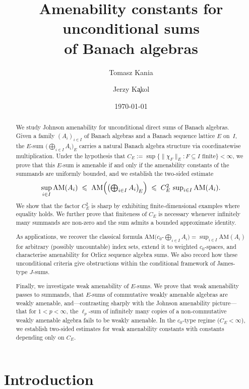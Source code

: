 \documentclass[reqno]{amsart}
\title[Amenability of unconditional sums]{Amenability constants for unconditional sums\\ of Banach algebras}
\author[T.~Kania]{Tomasz Kania}
\author{Jerzy K\c akol}
\date{\today}
\theoremstyle{plain}
\theoremstyle{definition}
\theoremstyle{remark}
\newcommand{\AM}{\mathrm{AM}}
\renewcommand{\le}{\leqslant}
\begin{document}
\begin{abstract}
We study Johnson amenability for unconditional direct sums of Banach algebras.
Given a family $(A_i)_{i\in I}$ of Banach algebras and a Banach sequence lattice $E$ on~$I$,
the $E$-sum $\bigl(\bigoplus_{i\in I} A_i\bigr)_{\!E}$ carries a natural Banach algebra structure
via coordinatewise multiplication.
Under the hypothesis that $C_E := \sup\{\|\chi_F\|_E: F\subseteq I\text{ finite}\}<\infty$,
we prove that this $E$-sum is amenable if and only if the amenability constants of the summands
are uniformly bounded, and we establish the two-sided estimate
\[
\sup_{i\in I}\AM(A_i) \;\le\; \AM\Bigl(\bigl(\textstyle\bigoplus_{i\in I} A_i\bigr)_{\!E}\Bigr)
\;\le\; C_E^2\,\sup_{i\in I}\AM(A_i).
\]
We show that the factor $C_E^2$ is sharp by exhibiting finite-dimensional examples where equality holds.
We further prove that finiteness of $C_E$ is necessary whenever infinitely many summands are non-zero
and the sum admits a bounded approximate identity.

As applications, we recover the classical formula
$\AM\bigl(c_0\text{-}\bigoplus_{i\in I} A_i\bigr) = \sup_{i\in I}\AM(A_i)$
for arbitrary (possibly uncountable) index sets, extend it to weighted $c_0$-spaces,
and characterise amenability for Orlicz sequence algebra sums.
We also record how these unconditional criteria give obstructions within the
conditional framework of James-type $J$-sums.

Finally, we investigate weak amenability of $E$-sums.
We prove that weak amenability passes to summands, that $E$-sums of commutative
weakly amenable algebras are weakly amenable, and---contrasting sharply with the
Johnson amenability picture---that for $1 < p < \infty$, the $\ell_p$-sum of
infinitely many copies of a non-commutative weakly amenable algebra fails to be
weakly amenable.
In the $c_0$-type regime ($C_E < \infty$), we establish two-sided estimates
for weak amenability constants with constants depending only on $C_E$.
\end{abstract}
\maketitle

\section{Introduction}
\end{document}
